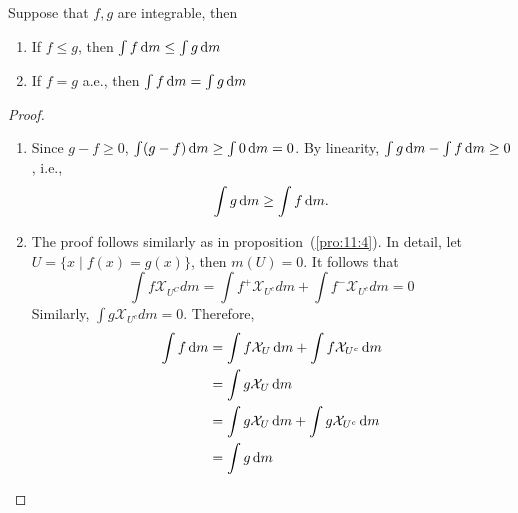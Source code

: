 \begin{corollary}
Suppose that $f,g$ are integrable, then 
\begin{enumerate}
\item
If $f\le g$, then $\int f\,\mathrm{d} m\le \int g\,\mathrm{d} m$
\item
If $f=g$ a.e., then $\int f\,\mathrm{d} m = \int g\,\mathrm{d} m$
\end{enumerate}
\end{corollary}
\begin{proof}
\begin{enumerate}
\item
Since $g-f\ge0$, $\int(g-f)\,\mathrm{d} m\ge\int0\,\mathrm{d} m=0$.
By linearity, $\int g\,\mathrm{d} m-\int f\,\mathrm{d} m\ge0$, i.e.,
\[
\int g\,\mathrm{d} m\ge \int f\,\mathrm{d} m.
\]
\item
The proof follows similarly as in proposition~(\ref{pro:11:4}). In detail, 
let $U=\{x\mid f(x)=g(x)\}$, then $m(U) = 0$. It follows that
\[
\int f \mathcal{X}_{U^C}dm = \int f^+\mathcal{X}_{U^c}dm + \int f^- \mathcal{X}_{U^c}dm = 0
\]
Similarly, $\int g\mathcal{X}_{U^c}dm = 0$. Therefore, 
\begin{align*}
\int f\,\mathrm{d} m&=\int f\mathcal{X}_U\,\mathrm{d} m
+
\int f\mathcal{X}_{U^c}\,\mathrm{d} m\\
&=\int g\mathcal{X}_U\,\mathrm{d} m\\
&=\int g\mathcal{X}_U\,\mathrm{d} m+\int g\mathcal{X}_{U^c}\,\mathrm{d} m\\
&=\int g\,\mathrm{d} m
\end{align*}


\end{enumerate}
\end{proof}


